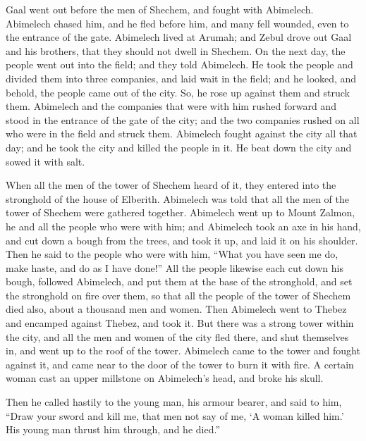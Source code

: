  Gaal went out before the men of Shechem, and fought with
Abimelech.  Abimelech chased him, and he fled before him,
and many fell wounded, even to the entrance of the gate. 
Abimelech lived at Arumah; and Zebul drove out Gaal and his brothers,
that they should not dwell in Shechem.  On the next day,
the people went out into the field; and they told Abimelech.
 He took the people and divided them into three
companies, and laid wait in the field; and he looked, and behold, the
people came out of the city. So, he rose up against them and struck
them.  Abimelech and the companies that were with him
rushed forward and stood in the entrance of the gate of the city; and
the two companies rushed on all who were in the field and struck them.
 Abimelech fought against the city all that day; and he
took the city and killed the people in it. He beat down the city and
sowed it with salt.

 When all the men of the tower of Shechem heard of it,
they entered into the stronghold of the house of Elberith.
 Abimelech was told that all the men of the tower of
Shechem were gathered together.  Abimelech went up to
Mount Zalmon, he and all the people who were with him; and Abimelech
took an axe in his hand, and cut down a bough from the trees, and took
it up, and laid it on his shoulder. Then he said to the people who were
with him, ``What you have seen me do, make haste, and do as I have
done!''  All the people likewise each cut down his bough,
followed Abimelech, and put them at the base of the stronghold, and set
the stronghold on fire over them, so that all the people of the tower of
Shechem died also, about a thousand men and women.  Then
Abimelech went to Thebez and encamped against Thebez, and took it.
 But there was a strong tower within the city, and all
the men and women of the city fled there, and shut themselves in, and
went up to the roof of the tower.  Abimelech came to the
tower and fought against it, and came near to the door of the tower to
burn it with fire.  A certain woman cast an upper
millstone on Abimelech's head, and broke his skull.

 Then he called hastily to the young man, his armour
bearer, and said to him, ``Draw your sword and kill me, that men not say
of me, `A woman killed him.' His young man thrust him through, and he
died.''

